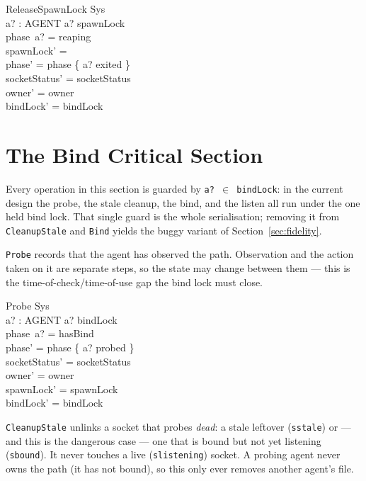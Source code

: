 \documentclass[a4paper,10pt,fleqn]{article}
\begin{document}
\begin{schema}{ReleaseSpawnLock}
  \Delta Sys \\
  a? : AGENT
\where
  a? \in spawnLock \\
  phase~a? = reaping \\
  spawnLock' = \emptyset \\
  phase' = phase \oplus \{ a? \mapsto exited \} \\
  socketStatus' = socketStatus \\
  owner' = owner \\
  bindLock' = bindLock
\end{schema}

\section{The Bind Critical Section}

Every operation in this section is guarded by \texttt{a? $\in$ bindLock}:
in the current design the probe, the stale cleanup, the bind, and the
listen all run under the one held bind lock.  That single guard is the
whole serialisation; removing it from \texttt{CleanupStale} and
\texttt{Bind} yields the buggy variant of Section~\ref{sec:fidelity}.

\texttt{Probe} records that the agent has observed the path.  Observation
and the action taken on it are separate steps, so the state may change
between them --- this is the time-of-check/time-of-use gap the bind lock
must close.

\begin{schema}{Probe}
  \Delta Sys \\
  a? : AGENT
\where
  a? \in bindLock \\
  phase~a? = hasBind \\
  phase' = phase \oplus \{ a? \mapsto probed \} \\
  socketStatus' = socketStatus \\
  owner' = owner \\
  spawnLock' = spawnLock \\
  bindLock' = bindLock
\end{schema}

\texttt{CleanupStale} unlinks a socket that probes \emph{dead}: a stale
leftover (\texttt{sstale}) or --- and this is the dangerous case --- one
that is bound but not yet listening (\texttt{sbound}).  It never touches
a live (\texttt{slistening}) socket.  A probing agent never owns the path
(it has not bound), so this only ever removes another agent's file.
\end{document}
